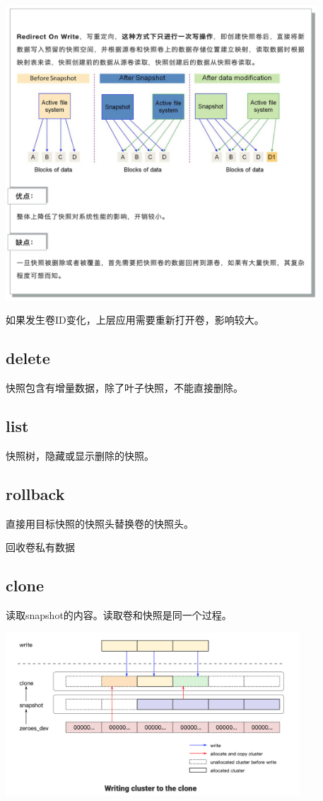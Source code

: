 \begin{center}
\includegraphics[height=11cm]{../imgs/row-snapshot.png}
\end{center}

如果发生卷ID变化，上层应用需要重新打开卷，影响较大。

\subsection{delete}

快照包含有增量数据，除了叶子快照，不能直接删除。

\subsection{list}

快照树，隐藏或显示删除的快照。

\subsection{rollback}

直接用目标快照的快照头替换卷的快照头。

回收卷私有数据

\subsection{clone}

读取snapshot的内容。读取卷和快照是同一个过程。

\begin{center}
\includegraphics[width=11cm]{../imgs/clone-write.png}
\end{center}

